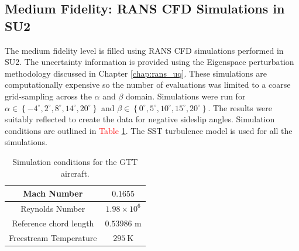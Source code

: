 \subsection{Medium Fidelity: RANS CFD Simulations in SU2} \label{subsec:gtt_cfd_data_gen}

The medium fidelity level is filled using RANS CFD simulations performed in SU2.
The uncertainty information is provided using the Eigenspace perturbation methodology discussed in Chapter \ref{chap:rans_uq}.
These simulations are computationally expensive so the number of evaluations was limited to a coarse grid-sampling across the $\alpha$ and $\beta$ domain.
Simulations were run for $\alpha \in \left \{ -4^\circ,2^\circ,8^\circ,14^\circ,20^\circ \right \}$ and $\beta \in \left \{ 0^\circ,5^\circ,10^\circ,15^\circ,20^\circ \right \}$.
The results were suitably reflected to create the data for negative sideslip angles. 
Simulation conditions are outlined in \textcolor{red}{Table \ref{tab:gtt_test_cond}}. 
The SST turbulence model is used for all the simulations.

\begin{table}
\centering
    \renewcommand{\arraystretch}{1.2}
    \captionsetup{justification=centering}
    \caption{Simulation conditions for the GTT aircraft.} 
    \begin{tabular}{|c|c|}
        \hline
        Mach Number & $0.1655$ \\ \hline
        Reynolds Number & $1.98\times10^6$ \\ \hline
        Reference chord length & $0.53986$ m \\ \hline
        Freestream Temperature & $295~\text{K}$ \\ \hline
    \end{tabular}
    \label{tab:gtt_test_cond}
\end{table}

